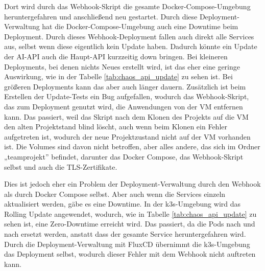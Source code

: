 Dort wird durch das Webhook-Skript die gesamte Docker-Compose-Umgebung heruntergefahren und anschließend neu gestartet. Durch diese Deployment-Verwaltung hat die Docker-Compose-Umgebung auch eine Downtime beim Deployment.
Durch dieses Webhook-Deployment fallen auch direkt alle Services aus, selbst wenn diese eigentlich kein Update haben. Dadurch könnte ein Update der AI-API auch die Haupt-API kurzzeitig down bringen.
Bei kleineren Deployments, bei denen nichts Neues erstellt wird, ist das eher eine geringe Auswirkung, wie in der Tabelle \ref{tab:chaos_api_update} zu sehen ist. Bei größeren Deployments kann das aber auch länger dauern.
Zusätzlich ist beim Erstellen der Update-Tests ein Bug aufgefallen, wodurch das Webhook-Skript, das zum Deployment genutzt wird, die Anwendungen von der VM entfernen kann.
Das passiert, weil das Skript nach dem Klonen des Projekts auf die VM den alten Projektstand blind löscht, auch wenn beim Klonen ein Fehler aufgetreten ist, wodurch der neue Projektzustand nicht auf der VM vorhanden ist.
Die Volumes sind davon nicht betroffen, aber alles andere, das sich im Ordner „teamprojekt” befindet, darunter das Docker Compose, das Webhook-Skript selbst und auch die TLS-Zertifikate.

Dies ist jedoch eher ein Problem der Deployment-Verwaltung durch den Webhook als durch Docker Compose selbst. Aber auch wenn die Services einzeln aktualisiert werden, gäbe es eine Downtime.
In der k3s-Umgebung wird das Rolling Update angewendet, wodurch, wie in Tabelle \ref{tab:chaos_api_update} zu sehen ist, eine Zero-Downtime erreicht wird. Das passiert, da die Pods nach und nach ersetzt werden, anstatt dass der gesamte Service heruntergefahren wird.
Durch die Deployment-Verwaltung mit FluxCD übernimmt die k3s-Umgebung das Deployment selbst, wodurch dieser Fehler mit dem Webhook nicht auftreten kann.


